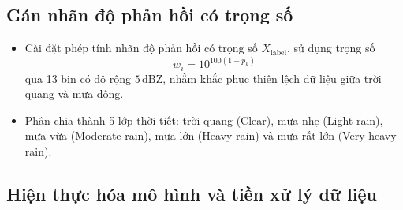 \documentclass[12pt, a4paper]{article}
\begin{document}
\subsection{Gán nhãn độ phản hồi có trọng số}
\begin{itemize}[leftmargin=*]
    \item Cài đặt phép tính nhãn độ phản hồi có trọng số $X_{\mathrm{label}}$, sử dụng trọng số
    \[
        w_i = 10^{100(1-p_k)}
    \]
    qua 13 bin có độ rộng $5\,\mathrm{dBZ}$, nhằm khắc phục thiên lệch dữ liệu giữa trời quang và mưa dông.
    \item Phân chia thành 5 lớp thời tiết: trời quang (Clear), mưa nhẹ (Light rain), mưa vừa (Moderate rain), mưa lớn (Heavy rain) và mưa rất lớn (Very heavy rain).
\end{itemize}

\subsection{Hiện thực hóa mô hình và tiền xử lý dữ liệu}
\end{document}
